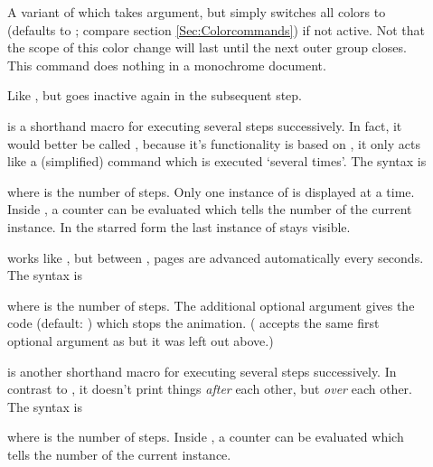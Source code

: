 \begin{slide}
\begin{description}
  \item[]
    A variant of  which takes  argument, but simply
    switches all colors to  (defaults to
    ; compare section \ref{Sec:Colorcommands}) if not
    active. Not that the scope of this color change will last until the next outer group closes. This command does
    nothing in a monochrome document.

  \item[]
    Like , but goes inactive again in the subsequent step.

  \item[]
   is a shorthand macro for executing several steps successively. In
   fact, it would better be called , because it's
   functionality is based on , it only acts like a
   (simplified)  command which is executed `several times'.
   The syntax is
   \begin{center}
   \end{center}
   where  is the number of steps. Only one instance of
    is displayed at a time. Inside , a
   counter  can be evaluated which tells the number of the
   current instance. In the starred form the last instance of
    stays visible.

  \item[]
    works like , but between , pages are
    advanced automatically every  seconds. The syntax is
   \begin{center}
   \end{center}
   where  is the number of steps. The additional optional argument
    gives the code (default: )
    which stops the animation.
   ( accepts the same first optional argument as
    but it was left out above.)


  \item[]
    is another shorthand macro for executing several steps successively. In
    contrast to , it doesn't print things \emph{after}
    each other, but \emph{over} each other. The syntax is
    \begin{center}
    \end{center}
    where  is the number of steps. Inside , a
    counter  can be evaluated which tells the number of the
    current instance.
    \newslide


\end{description}
\end{slide}
